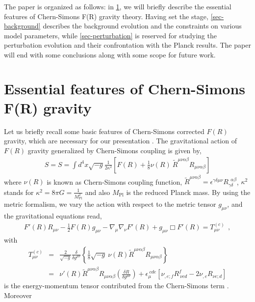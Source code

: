 \documentclass{article}
\begin{document}
The paper is organized as follows: in \ref{sec-model}, 
we will briefly describe the essential features of Chern-Simons F(R) gravity theory. 
Having set the stage, \ref{sec-background} describes the background evolution and the constraints on various model parameters, 
while \ref{sec-perturbation} is reserved for studying the perturbation evolution and their confrontation with the Planck results. 
The paper will end with some conclusions along with some scope for future work.


\section{Essential features of Chern-Simons F(R) gravity}\label{sec-model}

Let us briefly recall some basic features of Chern-Simons corrected $F(R)$ gravity, which are necessary for our presentation 
\cite{Hwang:2005hb,Odintsov:2019mlf}. 
The gravitational action of $F(R)$ gravity generalized by Chern-Simons coupling is given by,
\begin{eqnarray}
 S = S = \int d^4x\sqrt{-g}\frac{1}{2\kappa^2}\left[F(R) + \frac{1}{8}\nu(R)~\tilde{R}^{\mu\nu\alpha\beta}R_{\mu\nu\alpha\beta}\right]
 \label{action}
\end{eqnarray}
where $\nu(R)$ is known as Chern-Simons coupling function, 
$\tilde{R}^{\mu\nu\alpha\beta} = \epsilon^{\gamma\delta\mu\nu}R_{\gamma\delta}^{~~\alpha\beta}$, 
$\kappa^2$ stands for $\kappa^2 = 8\pi G = \frac{1}{M_\mathrm{Pl}^2}$ and also $M_\mathrm{Pl}$ 
is the reduced Planck mass. By using the metric formalism, we vary the
action with respect to the metric tensor $g_{\mu\nu}$, and the gravitational equations read,
\begin{eqnarray}
 F'(R)R_{\mu\nu} - \frac{1}{2}F(R)g_{\mu\nu} - \nabla_{\mu}\nabla_{\nu}F'(R) + g_{\mu\nu}\Box F'(R) = T^{(c)}_{\mu\nu}~~,
 \label{basic2}
\end{eqnarray}
with
\begin{eqnarray}
 T^{(c)}_{\mu\nu}&=&
 \frac{2}{\sqrt{-g}}\frac{\delta}{\delta g^{\mu\nu}}\left\{\frac{1}{8}\sqrt{-g}~\nu(R)\tilde{R}^{\mu\nu\alpha\beta}R_{\mu\nu\alpha\beta}\right\}\nonumber\\
 &=&\nu'(R)\tilde{R}^{\mu\nu\alpha\beta}R_{\mu\nu\alpha\beta}\left(\frac{\delta R}{\delta g^{\mu\nu}}\right) 
 + \epsilon_{\mu}^{~cde}\left[\nu_{,e;f}R^{f}_{~\nu cd} - 2\nu_{,e}R_{\nu c;d}\right]
 \label{EM tensor-CS}
\end{eqnarray}
is the energy-momentum tensor contributed from the Chern-Simons term \cite{Hwang:2005hb}. Moreover 
\end{document}
